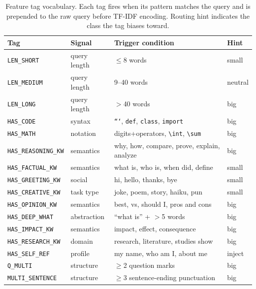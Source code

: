 \documentclass{article}
\begin{document}
\begin{table}[t]
\caption{Feature tag vocabulary. Each tag fires when its pattern matches
the query and is prepended to the raw query before TF-IDF encoding.
Routing hint indicates the class the tag biases toward.}
\label{tab:features}
\centering
\small
\begin{tabular}{llp{4.8cm}l}
\toprule
\textbf{Tag} & \textbf{Signal} & \textbf{Trigger condition} & \textbf{Hint} \\
\midrule
\texttt{LEN\_SHORT}       & query length & $\leq$8 words        & small \\
\texttt{LEN\_MEDIUM}      & query length & 9--40 words          & neutral \\
\texttt{LEN\_LONG}        & query length & $>$40 words          & big \\
\texttt{HAS\_CODE}        & syntax       & \texttt{```}, \texttt{def}, \texttt{class}, \texttt{import} & big \\
\texttt{HAS\_MATH}        & notation     & digits+operators, \texttt{\textbackslash{}int}, \texttt{\textbackslash{}sum} & big \\
\texttt{HAS\_REASONING\_KW}  & semantics & why, how, compare, prove, explain, analyze & big \\
\texttt{HAS\_FACTUAL\_KW}    & semantics & what is, who is, when did, define & small \\
\texttt{HAS\_GREETING\_KW}   & social    & hi, hello, thanks, bye & small \\
\texttt{HAS\_CREATIVE\_KW}   & task type & joke, poem, story, haiku, pun & small \\
\texttt{HAS\_OPINION\_KW}    & semantics & best, vs, should I, pros and cons & big \\
\texttt{HAS\_DEEP\_WHAT}     & abstraction & ``what is'' + $>$5 words & big \\
\texttt{HAS\_IMPACT\_KW}     & semantics & impact, effect, consequence & big \\
\texttt{HAS\_RESEARCH\_KW}   & domain    & research, literature, studies show & big \\
\texttt{HAS\_SELF\_REF}      & profile   & my name, who am I, about me & inject \\
\texttt{Q\_MULTI}            & structure & $\geq$2 question marks & big \\
\texttt{MULTI\_SENTENCE}     & structure & $\geq$3 sentence-ending punctuation & big \\
\bottomrule
\end{tabular}
\end{table}
\end{document}
